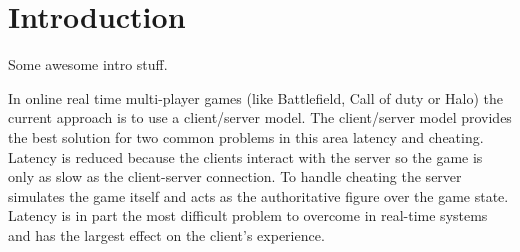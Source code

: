 
\section{Introduction}
\label{sec:Intro}

Some awesome intro stuff.

In online real time multi-player games (like Battlefield, Call of duty or Halo) the current approach is to use a client/server model. The client/server model provides the best solution for two common problems in this area latency and cheating. Latency is reduced because the clients interact with the server so the game is only as slow as the client-server connection. To handle cheating the server simulates the game itself and acts as the authoritative figure over the game state. Latency is in part the most difficult problem to overcome in real-time systems and has the largest effect on the client’s experience.

